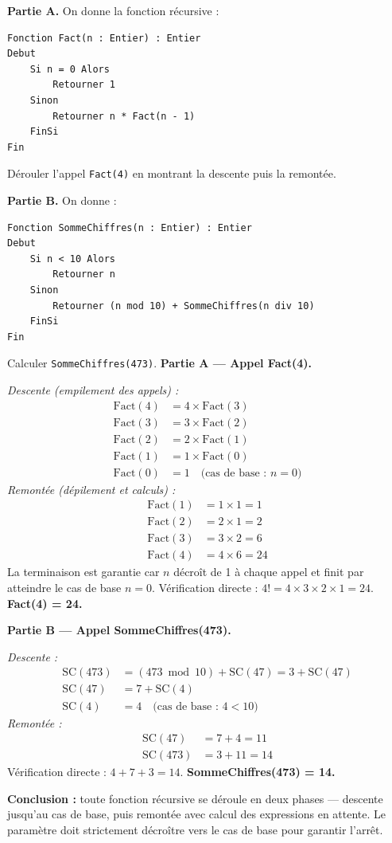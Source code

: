 \documentclass[11pt]{article}
\begin{document}
\begin{exoresolu}
\textbf{Partie A.} On donne la fonction récursive :
\begin{lstlisting}
Fonction Fact(n : Entier) : Entier
Debut
    Si n = 0 Alors
        Retourner 1
    Sinon
        Retourner n * Fact(n - 1)
    FinSi
Fin
\end{lstlisting}
Dérouler l'appel \texttt{Fact(4)} en montrant la descente puis la remontée.

\textbf{Partie B.} On donne :
\begin{lstlisting}
Fonction SommeChiffres(n : Entier) : Entier
Debut
    Si n < 10 Alors
        Retourner n
    Sinon
        Retourner (n mod 10) + SommeChiffres(n div 10)
    FinSi
Fin
\end{lstlisting}
Calculer \texttt{SommeChiffres(473)}.
\tcblower
\textbf{Partie A — Appel Fact(4).}

\emph{Descente (empilement des appels) :}
\begin{align*}
\text{Fact}(4) &= 4 \times \text{Fact}(3)\\
\text{Fact}(3) &= 3 \times \text{Fact}(2)\\
\text{Fact}(2) &= 2 \times \text{Fact}(1)\\
\text{Fact}(1) &= 1 \times \text{Fact}(0)\\
\text{Fact}(0) &= 1 \quad \text{(cas de base : } n = 0\text{)}
\end{align*}
\emph{Remontée (dépilement et calculs) :}
\begin{align*}
\text{Fact}(1) &= 1 \times 1 = 1\\
\text{Fact}(2) &= 2 \times 1 = 2\\
\text{Fact}(3) &= 3 \times 2 = 6\\
\text{Fact}(4) &= 4 \times 6 = 24
\end{align*}
La terminaison est garantie car $n$ décroît de 1 à chaque appel et finit par atteindre le cas de base $n = 0$. Vérification directe : $4! = 4 \times 3 \times 2 \times 1 = 24$. \textbf{Fact(4) = 24.}

\textbf{Partie B — Appel SommeChiffres(473).}

\emph{Descente :}
\begin{align*}
\text{SC}(473) &= (473 \bmod 10) + \text{SC}(47) = 3 + \text{SC}(47)\\
\text{SC}(47) &= 7 + \text{SC}(4)\\
\text{SC}(4) &= 4 \quad \text{(cas de base : } 4 < 10\text{)}
\end{align*}
\emph{Remontée :}
\begin{align*}
\text{SC}(47) &= 7 + 4 = 11\\
\text{SC}(473) &= 3 + 11 = 14
\end{align*}
Vérification directe : $4 + 7 + 3 = 14$. \textbf{SommeChiffres(473) = 14.}

\textbf{Conclusion :} toute fonction récursive se déroule en deux phases — descente jusqu'au cas de base, puis remontée avec calcul des expressions en attente. Le paramètre doit strictement décroître vers le cas de base pour garantir l'arrêt.
\end{exoresolu}
\end{document}
